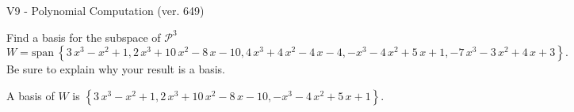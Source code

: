 \begin{exercise}
  \begin{exerciseTitle}V9 - Polynomial Computation (ver. 649)\end{exerciseTitle}
  \begin{exerciseStatement}
    Find a basis for the subspace of \(\mathcal{P}^3\) 
\[W=\mathrm{span}\ \left\{3 \, x^{3} - x^{2} + 1 , 2 \, x^{3} + 10 \, x^{2} - 8 \, x - 10 , 4 \, x^{3} + 4 \, x^{2} - 4 \, x - 4 , -x^{3} - 4 \, x^{2} + 5 \, x + 1 , -7 \, x^{3} - 3 \, x^{2} + 4 \, x + 3\right\}.\]
 Be sure to explain why your result is a basis.


  \end{exerciseStatement}
  \begin{exerciseAnswer}
   A basis of \(W\) is  \(\left\{3 \, x^{3} - x^{2} + 1 , 2 \, x^{3} + 10 \, x^{2} - 8 \, x - 10 , -x^{3} - 4 \, x^{2} + 5 \, x + 1\right\}\).
  


  \end{exerciseAnswer}
\end{exercise}
